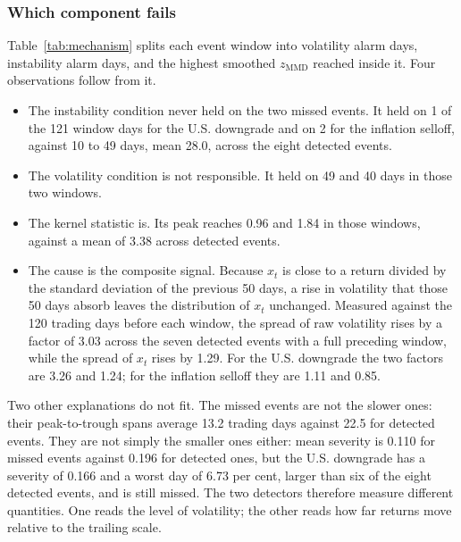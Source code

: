 \documentclass[pdflatex,sn-mathphys-num,iicol]{sn-jnl}
\begin{document}
\subsubsection{Which component fails}
\label{sec:mechanism}
Table~\ref{tab:mechanism} splits each event window into volatility alarm days, instability alarm days, and the highest smoothed $z_{\mathrm{MMD}}$ reached inside it. Four observations follow from it.
\begin{itemize}
\item The instability condition never held on the two missed events. It held on 1 of the 121 window days for the U.S. downgrade and on 2 for the inflation selloff, against 10 to 49 days, mean 28.0, across the eight detected events.
\item The volatility condition is not responsible. It held on 49 and 40 days in those two windows.
\item The kernel statistic is. Its peak reaches 0.96 and 1.84 in those windows, against a mean of 3.38 across detected events.
\item The cause is the composite signal. Because $x_t$ is close to a return divided by the standard deviation of the previous 50 days, a rise in volatility that those 50 days absorb leaves the distribution of $x_t$ unchanged. Measured against the 120 trading days before each window, the spread of raw volatility rises by a factor of 3.03 across the seven detected events with a full preceding window, while the spread of $x_t$ rises by 1.29. For the U.S. downgrade the two factors are 3.26 and 1.24; for the inflation selloff they are 1.11 and 0.85.
\end{itemize}
Two other explanations do not fit. The missed events are not the slower ones: their peak-to-trough spans average 13.2 trading days against 22.5 for detected events. They are not simply the smaller ones either: mean severity is 0.110 for missed events against 0.196 for detected ones, but the U.S. downgrade has a severity of 0.166 and a worst day of 6.73 per cent, larger than six of the eight detected events, and is still missed. The two detectors therefore measure different quantities. One reads the level of volatility; the other reads how far returns move relative to the trailing scale.
\end{document}
